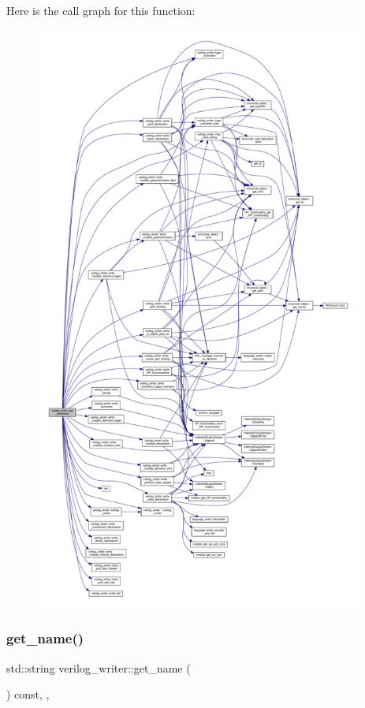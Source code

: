 Here is the call graph for this function\+:
\nopagebreak
\begin{figure}[H]
\begin{center}
\leavevmode
\includegraphics[height=550pt]{d8/dba/classverilog__writer_a4dade87869d04a1a2b166efa8c0a2253_cgraph}
\end{center}
\end{figure}
\mbox{\label{classverilog__writer_a59b2afa9a031c6fff601b4f349dd434b}} 
\subsubsection{\texorpdfstring{get\+\_\+name()}{get\_name()}}
{\footnotesize\ttfamily std\+::string verilog\+\_\+writer\+::get\+\_\+name (\begin{DoxyParamCaption}{ }\end{DoxyParamCaption}) const\hspace{0.3cm}{\ttfamily [inline]}, {\ttfamily [override]}, {\ttfamily [virtual]}}



